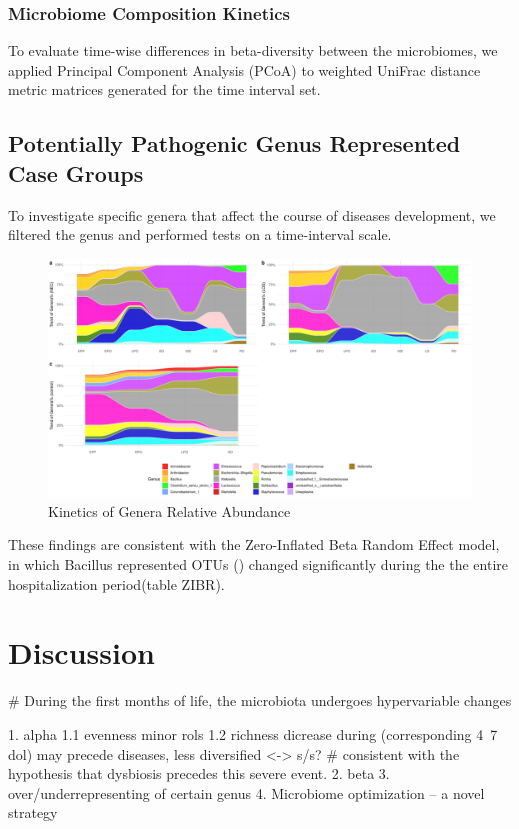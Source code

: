 \documentclass[fleqn,10pt,lineno]{wlpeerj} %
\begin{document}
    \subsubsection*{Microbiome Composition Kinetics}
    To evaluate time-wise differences in beta-diversity between the microbiomes, we applied Principal Component Analysis (PCoA) to weighted UniFrac distance metric matrices generated for the time interval set. 

  \subsection*{Potentially Pathogenic Genus Represented Case Groups}
  To investigate specific genera that affect the course of diseases development, we filtered the genus and performed tests on a time-interval scale.
  \begin{figure}[ht]\centering
    \includegraphics[width=\linewidth]{figure/taxa-time.pdf}
    \caption{Kinetics of Genera Relative Abundance}
    \label{fig:taxa-time}
  \end{figure}


  These findings are consistent with the Zero-Inflated Beta Random Effect model, in which Bacillus represented OTUs () changed significantly during the the entire hospitalization period(table ZIBR).

\section*{Discussion}
\# During the first months of life, the microbiota undergoes hypervariable changes

1. alpha  1.1 evenness minor rols 1.2 richness dicrease during  (corresponding 4~7 dol) may precede diseases, less diversified <-> s/s? \# consistent with the hypothesis that dysbiosis precedes this severe event.
2. beta
3. over/underrepresenting of certain genus
4. Microbiome optimization -- a novel strategy
\end{document}
